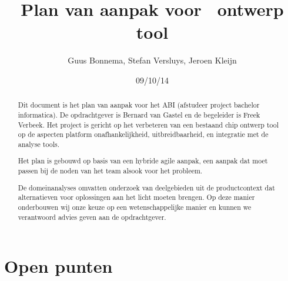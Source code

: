 \documentclass[a4paper,11pt]{article}
\author{Guus Bonnema, Stefan Versluys, Jeroen Kleijn}
\date{09/10/14}
\title{Plan van aanpak voor \xmas\ ontwerp tool}
\begin{document}

\newcommand{\xmas}{x\textsc{mas}}%
\newcommand{\ok}{$\checkmark$}


\newcommand\secformat[1]{%
    {\fontsize{60}{60}\selectfont\thesection}%
    \quad\rule[-8pt]{2pt}{40pt}\quad
    \parbox[b]{.7\textwidth}{\filright\bfseries #1}}%
\titleformat{\section}[block]
    {\filright\normalfont\sffamily}{}{0pt}{\secformat}
[1pc]

\maketitle

\begin{abstract}
 Dit document is het plan van aanpak voor het ABI (afstudeer project bachelor
 informatica). De opdrachtgever is Bernard van Gastel en de begeleider is
 Freek Verbeek. Het project is gericht op het verbeteren van een bestaand
 chip ontwerp tool op de aspecten platform onafhankelijkheid, uitbreidbaarheid,
 en integratie met de analyse tools.

 Het plan is gebouwd op basis van een hybride agile aanpak, een aanpak dat
 moet passen bij de noden van het team alsook voor het probleem.

 De domeinanalyses omvatten onderzoek van deelgebieden uit de productcontext
 dat alternatieven voor oplossingen aan het licht moeten brengen.
 Op deze manier onderbouwen wij onze keuze op een wetenschappelijke manier
 en kunnen we verantwoord advies geven aan de opdrachtgever.

\end{abstract}

\listoftodos

\section{Open punten}
\end{document}
